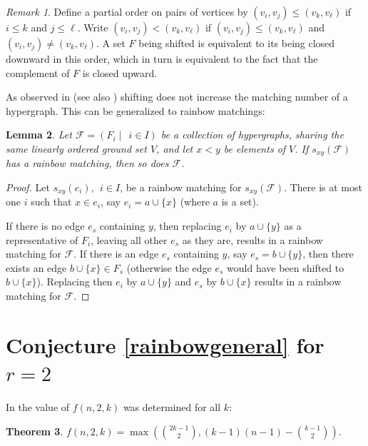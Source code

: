 \documentclass{amsart}
\newtheorem{theorem}{Theorem}[section]
\newtheorem{lemma}[theorem]{Lemma}
\theoremstyle{remark}
\newtheorem{remark}[theorem]{Remark}
\newcommand{\cf}{\mathcal F}
\begin{document}
\begin{remark}\label{shifted}
Define a partial order on pairs of vertices  by $(v_i,v_j) \le
(v_k,v_\ell)$ if $i \le k$ and $j \le \ell$. Write $(v_i,v_j) <
(v_k,v_\ell)$ if $(v_i,v_j) \le (v_k,v_\ell)$ and $(v_i,v_j) \neq
(v_k,v_\ell)$. A set $F$ being shifted is equivalent to its being
closed downward in this order, which in turn is equivalent to the
fact that the complement of $F$ is closed upward.
\end{remark}

As observed in \cite{erdosplus} (see also \cite{af}) shifting does not increase the matching number of a hypergraph.
This can be generalized to rainbow matchings:

\begin{lemma}\label{shifting}
Let $\cf=(F_i \mid~~i\in I)$ be a collection of hypergraphs, sharing the same
linearly ordered ground set $V$, and let $x<y$ be elements of $V$. If
$s_{xy}(\cf)$ has a rainbow matching, then so does $\cf$.
\end{lemma}

\begin{proof}
Let $s_{xy}(e_i),~~i \in I$, be a rainbow matching for
$s_{xy}(\cf)$. There is at most one $i$ such that $x \in e_i$, say
$e_i=a \cup\{x\}$ (where $a$ is a set).


 If there
is no edge $e_s$ containing $y$, then replacing $e_i$ by $a
\cup\{y\}$ as a representative of $F_i$, leaving all other $e_s$ as
they are, results in a rainbow matching for $\cf$. If there is an
edge $e_s$ containing $y$, say $e_s=b \cup\{y\}$, then there exists
an edge $b \cup\{x\} \in F_s$ (otherwise the edge $e_s$ would have
been shifted to $b \cup\{x\}$). Replacing then $e_i$ by $a
\cup\{y\}$ and $e_s$ by $b \cup\{x\}$ results in a rainbow matching
for $\cf$.
\end{proof}




\section{Conjecture \ref{rainbowgeneral} for $r=2$}

In \cite{erdosplus} the value of $f(n,2,k)$ was determined for all
$k$:

\begin{theorem}
$f(n,2,k)=\max(\binom{2k-1}{2},(k-1)(n-1)-\binom{k-1}{2})$.
\end{theorem}
\end{document}
